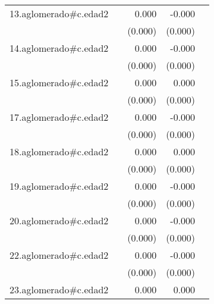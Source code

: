 {\begin{longtable}{l*{4}{D{.}{.}{-1}}}
\addlinespace
13.aglomerado#c.edad2&                     &       0.000\sym{*}  &      -0.000         &                     \\
            &                     &     (0.000)         &     (0.000)         &                     \\
\addlinespace
14.aglomerado#c.edad2&                     &       0.000         &      -0.000         &                     \\
            &                     &     (0.000)         &     (0.000)         &                     \\
\addlinespace
15.aglomerado#c.edad2&                     &       0.000         &       0.000         &                     \\
            &                     &     (0.000)         &     (0.000)         &                     \\
\addlinespace
17.aglomerado#c.edad2&                     &       0.000         &      -0.000\sym{*}  &                     \\
            &                     &     (0.000)         &     (0.000)         &                     \\
\addlinespace
18.aglomerado#c.edad2&                     &       0.000\sym{*}  &       0.000\sym{*}  &                     \\
            &                     &     (0.000)         &     (0.000)         &                     \\
\addlinespace
19.aglomerado#c.edad2&                     &       0.000         &      -0.000         &                     \\
            &                     &     (0.000)         &     (0.000)         &                     \\
\addlinespace
20.aglomerado#c.edad2&                     &       0.000         &      -0.000         &                     \\
            &                     &     (0.000)         &     (0.000)         &                     \\
\addlinespace
22.aglomerado#c.edad2&                     &       0.000         &      -0.000         &                     \\
            &                     &     (0.000)         &     (0.000)         &                     \\
\addlinespace
23.aglomerado#c.edad2&                     &       0.000         &       0.000         &                     \\

\end{longtable}}

